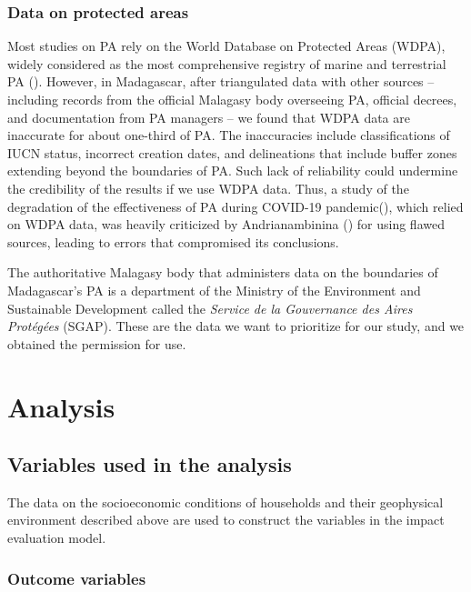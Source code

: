 \documentclass[
]{article}
\begin{document}
\subsubsection{Data on protected areas}\label{data-on-protected-areas}

Most studies on PA rely on the World Database on Protected Areas (WDPA),
widely considered as the most comprehensive registry of marine and
terrestrial PA (). However, in Madagascar, after triangulated data with other
sources -- including records from the official Malagasy body overseeing
PA, official decrees, and documentation from PA managers -- we found
that WDPA data are inaccurate for about one-third of PA. The
inaccuracies include classifications of IUCN status, incorrect creation
dates, and delineations that include buffer zones extending beyond the
boundaries of PA. Such lack of reliability could undermine the
credibility of the results if we use WDPA data. Thus, a study of the
degradation of the effectiveness of PA during COVID-19
pandemic(),
which relied on WDPA data, was heavily criticized by Andrianambinina
() for using flawed
sources, leading to errors that compromised its conclusions.

The authoritative Malagasy body that administers data on the boundaries
of Madagascar's PA is a department of the Ministry of the Environment
and Sustainable Development called the \emph{Service de la Gouvernance
des Aires Protégées} (SGAP). These are the data we want to prioritize
for our study, and we obtained the permission for use.

\section{Analysis}\label{analysis}

\subsection{Variables used in the
analysis}\label{variables-used-in-the-analysis}

The data on the socioeconomic conditions of households and their
geophysical environment described above are used to construct the
variables in the impact evaluation model.

\subsubsection{Outcome variables}\label{sec-outcome}
\end{document}
